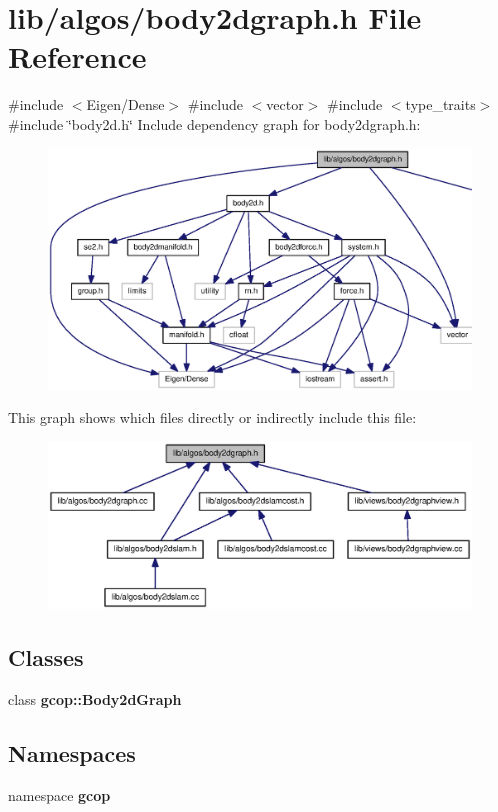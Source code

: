 \section{lib/algos/body2dgraph.h \-File \-Reference}
\label{body2dgraph_8h}
{\ttfamily \#include $<$\-Eigen/\-Dense$>$}\*
{\ttfamily \#include $<$vector$>$}\*
{\ttfamily \#include $<$type\-\_\-traits$>$}\*
{\ttfamily \#include \char`\"{}body2d.\-h\char`\"{}}\*
\-Include dependency graph for body2dgraph.\-h\-:
\nopagebreak
\begin{figure}[H]
\begin{center}
\leavevmode
\includegraphics[width=350pt]{body2dgraph_8h__incl}
\end{center}
\end{figure}
\-This graph shows which files directly or indirectly include this file\-:
\nopagebreak
\begin{figure}[H]
\begin{center}
\leavevmode
\includegraphics[width=350pt]{body2dgraph_8h__dep__incl}
\end{center}
\end{figure}
\subsection*{\-Classes}
\begin{DoxyCompactItemize}
\item 
class {\bf gcop\-::\-Body2d\-Graph}
\end{DoxyCompactItemize}
\subsection*{\-Namespaces}
\begin{DoxyCompactItemize}
\item 
namespace {\bf gcop}
\end{DoxyCompactItemize}
